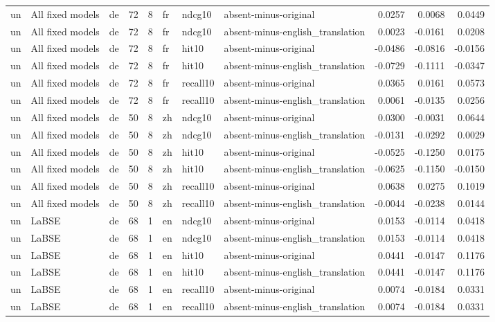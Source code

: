 \begin{tabular}{lllrrlllrrr}
un & All fixed models & de & 72 & 8 & fr & ndcg10 & absent-minus-original & 0.0257 & 0.0068 & 0.0449 \\
un & All fixed models & de & 72 & 8 & fr & ndcg10 & absent-minus-english\_translation & 0.0023 & -0.0161 & 0.0208 \\
un & All fixed models & de & 72 & 8 & fr & hit10 & absent-minus-original & -0.0486 & -0.0816 & -0.0156 \\
un & All fixed models & de & 72 & 8 & fr & hit10 & absent-minus-english\_translation & -0.0729 & -0.1111 & -0.0347 \\
un & All fixed models & de & 72 & 8 & fr & recall10 & absent-minus-original & 0.0365 & 0.0161 & 0.0573 \\
un & All fixed models & de & 72 & 8 & fr & recall10 & absent-minus-english\_translation & 0.0061 & -0.0135 & 0.0256 \\
un & All fixed models & de & 50 & 8 & zh & ndcg10 & absent-minus-original & 0.0300 & -0.0031 & 0.0644 \\
un & All fixed models & de & 50 & 8 & zh & ndcg10 & absent-minus-english\_translation & -0.0131 & -0.0292 & 0.0029 \\
un & All fixed models & de & 50 & 8 & zh & hit10 & absent-minus-original & -0.0525 & -0.1250 & 0.0175 \\
un & All fixed models & de & 50 & 8 & zh & hit10 & absent-minus-english\_translation & -0.0625 & -0.1150 & -0.0150 \\
un & All fixed models & de & 50 & 8 & zh & recall10 & absent-minus-original & 0.0638 & 0.0275 & 0.1019 \\
un & All fixed models & de & 50 & 8 & zh & recall10 & absent-minus-english\_translation & -0.0044 & -0.0238 & 0.0144 \\
un & LaBSE & de & 68 & 1 & en & ndcg10 & absent-minus-original & 0.0153 & -0.0114 & 0.0418 \\
un & LaBSE & de & 68 & 1 & en & ndcg10 & absent-minus-english\_translation & 0.0153 & -0.0114 & 0.0418 \\
un & LaBSE & de & 68 & 1 & en & hit10 & absent-minus-original & 0.0441 & -0.0147 & 0.1176 \\
un & LaBSE & de & 68 & 1 & en & hit10 & absent-minus-english\_translation & 0.0441 & -0.0147 & 0.1176 \\
un & LaBSE & de & 68 & 1 & en & recall10 & absent-minus-original & 0.0074 & -0.0184 & 0.0331 \\
un & LaBSE & de & 68 & 1 & en & recall10 & absent-minus-english\_translation & 0.0074 & -0.0184 & 0.0331 \\

\end{tabular}
